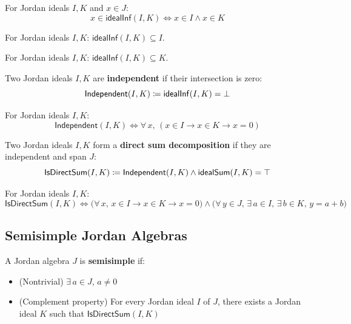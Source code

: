 \begin{lemma}
For Jordan ideals $I, K$ and $x \in J$:
\[ x \in \mathsf{idealInf}(I, K) \iff x \in I \land x \in K \]
\end{lemma}

\begin{lemma}
For Jordan ideals $I, K$: $\mathsf{idealInf}(I, K) \subseteq I$.
\end{lemma}

\begin{lemma}
For Jordan ideals $I, K$: $\mathsf{idealInf}(I, K) \subseteq K$.
\end{lemma}

\begin{definition}[Independent]
Two Jordan ideals $I, K$ are \textbf{independent} if their intersection is zero:
\[ \mathsf{Independent}(I, K) \coloneqq \mathsf{idealInf}(I, K) = \bot \]
\end{definition}

\begin{lemma}
For Jordan ideals $I, K$:
\[ \mathsf{Independent}(I, K) \iff \forall\, x,\, (x \in I \to x \in K \to x = 0) \]
\end{lemma}

\begin{definition}[IsDirectSum]
Two Jordan ideals $I, K$ form a \textbf{direct sum decomposition} if they are independent and span $J$:
\[ \mathsf{IsDirectSum}(I, K) \coloneqq \mathsf{Independent}(I, K) \land \mathsf{idealSum}(I, K) = \top \]
\end{definition}

\begin{lemma}
For Jordan ideals $I, K$:
\[ \mathsf{IsDirectSum}(I, K) \iff \bigl(\forall\, x,\, x \in I \to x \in K \to x = 0\bigr) \land \bigl(\forall\, y \in J,\, \exists\, a \in I,\, \exists\, b \in K,\, y = a + b\bigr) \]
\end{lemma}

\subsection{Semisimple Jordan Algebras}

\begin{definition}[IsSemisimpleJordan]
A Jordan algebra $J$ is \textbf{semisimple} if:
\begin{itemize}
  \item (Nontrivial) $\exists\, a \in J,\, a \ne 0$
  \item (Complement property) For every Jordan ideal $I$ of $J$, there exists a Jordan ideal $K$ such that $\mathsf{IsDirectSum}(I, K)$
\end{itemize}
\end{definition}


